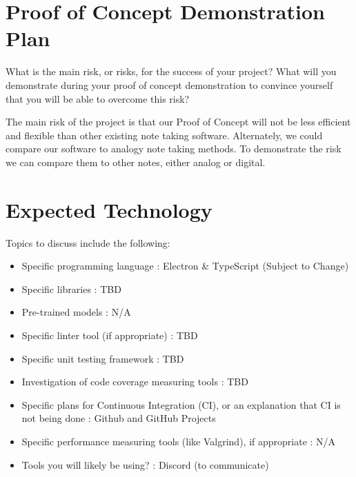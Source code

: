 \documentclass{article}
\begin{document}
\section{Proof of Concept Demonstration Plan}

What is the main risk, or risks, for the success of your project?  What will you
demonstrate during your proof of concept demonstration to convince yourself that
you will be able to overcome this risk?

The main risk of the project is that our Proof of Concept will not be less efficient and flexible than other existing note taking software. Alternately, we could compare our software to analogy note taking methods. To demonstrate the risk we can compare them to other notes, either analog or digital. 

\section{Expected Technology}



Topics to discuss include the following:

\begin{itemize}
\item Specific programming language : Electron \& TypeScript (Subject to Change)
\item Specific libraries : TBD
\item Pre-trained models : N/A
\item Specific linter tool (if appropriate) : TBD
\item Specific unit testing framework : TBD
\item Investigation of code coverage measuring tools : TBD
\item Specific plans for Continuous Integration (CI), or an explanation that CI
  is not being done : Github and GitHub Projects
\item Specific performance measuring tools (like Valgrind), if
  appropriate : N/A
\item Tools you will likely be using? : Discord (to communicate)
\end{itemize}
\end{document}
